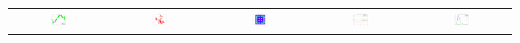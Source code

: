\documentclass[aspectratio=169]{beamer}
\begin{document}
\begin{frame}[containsverbatim]
  \begin{tabular}{@{}c@{}c@{}c@{}c@{}c@{}}
  \includegraphics[width=0.2\textwidth]{figures/plot_kriging.png}&
  \includegraphics[width=0.2\textwidth]{figures/plot_random_walk.png}&
  \includegraphics[width=0.2\textwidth]{figures/plot_sobol_field.png}&
  \includegraphics[width=0.2\textwidth]{figures/plot_monte_carlo.png}&
  \includegraphics[width=0.2\textwidth]{figures/plot_distribution_fitting.png}
  \end{tabular}
\end{frame}
  
\end{document}
